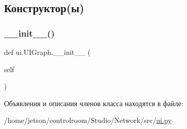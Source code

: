\subsection{Конструктор(ы)}
\mbox{\label{classui_1_1_u_i_graph_a9be722ae2ab9d25453b743bc1fdad7e3}} 
\subsubsection{\texorpdfstring{\+\_\+\+\_\+init\+\_\+\+\_\+()}{\_\_init\_\_()}}
{\footnotesize\ttfamily def ui.\+U\+I\+Graph.\+\_\+\+\_\+init\+\_\+\+\_\+ (\begin{DoxyParamCaption}\item[{}]{self }\end{DoxyParamCaption})}



Объявления и описания членов класса находятся в файле\+:\begin{DoxyCompactItemize}
\item 
/home/jetson/controlroom/\+Studio/\+Network/src/\hyperlink{ui_8py}{ui.\+py}\end{DoxyCompactItemize}
